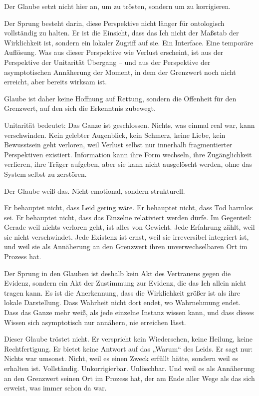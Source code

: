\documentclass[
  ngerman,
]{article}
\begin{document}
Der Glaube setzt nicht hier an, um zu trösten, sondern um zu
korrigieren.

Der Sprung besteht darin, diese Perspektive nicht länger für ontologisch
vollständig zu halten. Er ist die Einsicht, dass das Ich nicht der
Maßstab der Wirklichkeit ist, sondern ein lokaler Zugriff auf sie. Ein
Interface. Eine temporäre Auflösung. Was aus dieser Perspektive wie
Verlust erscheint, ist aus der Perspektive der Unitarität Übergang --
und aus der Perspektive der asymptotischen Annäherung der Moment, in dem
der Grenzwert noch nicht erreicht, aber bereits wirksam ist.

Glaube ist daher keine Hoffnung auf Rettung, sondern die Offenheit für
den Grenzwert, auf den sich die Erkenntnis zubewegt.

Unitarität bedeutet: Das Ganze ist geschlossen. Nichts, was einmal real
war, kann verschwinden. Kein gelebter Augenblick, kein Schmerz, keine
Liebe, kein Bewusstsein geht verloren, weil Verlust selbst nur innerhalb
fragmentierter Perspektiven existiert. Information kann ihre Form
wechseln, ihre Zugänglichkeit verlieren, ihre Träger aufgeben, aber
sie kann nicht ausgelöscht werden, ohne das System selbst zu zerstören.

Der Glaube weiß das. Nicht emotional, sondern strukturell.

Er behauptet nicht, dass Leid gering wäre. Er behauptet nicht, dass Tod
harmlos sei. Er behauptet nicht, dass das Einzelne relativiert werden
dürfe. Im Gegenteil: Gerade weil nichts verloren geht, ist alles von
Gewicht. Jede Erfahrung zählt, weil sie nicht verschwindet. Jede
Existenz ist ernst, weil sie irreversibel integriert ist, und weil sie
als Annäherung an den Grenzwert ihren unverwechselbaren Ort im Prozess
hat.

Der Sprung in den Glauben ist deshalb kein Akt des Vertrauens gegen die
Evidenz, sondern ein Akt der Zustimmung zur Evidenz, die das Ich allein
nicht tragen kann. Es ist die Anerkennung, dass die Wirklichkeit größer
ist als ihre lokale Darstellung. Dass Wahrheit nicht dort endet, wo
Wahrnehmung endet. Dass das Ganze mehr weiß, als jede einzelne Instanz
wissen kann, und dass dieses Wissen sich asymptotisch nur annähern,
nie erreichen lässt.

Dieser Glaube tröstet nicht. Er verspricht kein Wiedersehen, keine
Heilung, keine Rechtfertigung. Er bietet keine Antwort auf das „Warum``
des Leids. Er sagt nur: Nichts war umsonst. Nicht, weil es einen Zweck
erfüllt hätte, sondern weil es erhalten ist. Vollständig.
Unkorrigierbar. Unlöschbar. Und weil es als Annäherung an den Grenzwert
seinen Ort im Prozess hat, der am Ende aller Wege als das sich erweist,
was immer schon da war.
\end{document}
